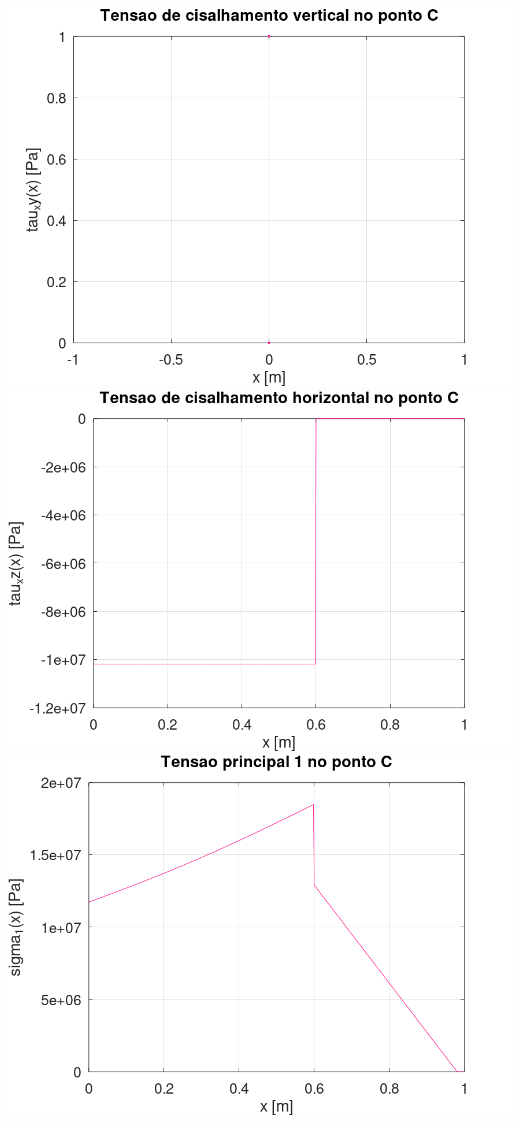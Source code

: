 \documentclass[10pt]{article}
\begin{document}
\begin{center}
    \includegraphics[scale=0.25]{figure28.png}
    \includegraphics[scale=0.25]{figure29.png}
    \includegraphics[scale=0.25]{figure30.png}

\end{center}
\end{document}
